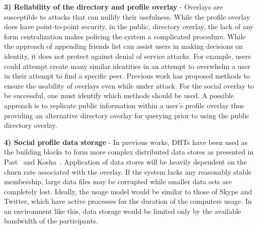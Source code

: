 {\bf 3) Reliability of the directory and profile overlay} - Overlays are
susceptible to attacks that can nullify their usefulness.  While the profile
overlay does have point-to-point security, in the public, directory overlay,
the lack of any form centralization makes policing the system a complicated
procedure.  While the approach of appending friends list can assist users in
making decisions on identity, it does not protect against denial of service
attacks.  For example, users could attempt create many similar identities in an
attempt to overwhelm a user in their attempt to find a specific peer.  Previous
work has proposed methods to ensure the usability of overlays even while under
attack.  For the social overlay to be successful, one must identify which
methods should be used. A possible approach is to replicate public information
within a user's profile overlay thus providing an alternative directory overlay
for querying prior to using the public directory overlay.

{\bf 4) Social profile data storage} - In previous works, DHTs have been used
as the building blocks to form more complex distributed data stores as
presented in Past~\cite{past} and Kosha~\cite{kosha}.  Application of data
stores will be heavily dependent on the churn rate associated with the overlay.
If the system lacks any reasonably stable membership, large data files may be
corrupted while smaller data sets are completely lost.  Ideally, the usage
model would be similar to those of Skype and Twitter, which have active
processes for the duration of the computers usage.  In an environment like
this, data storage would be limited only by the available bandwidth of the
participants.
